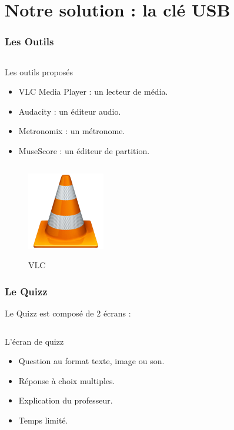 \section{Notre solution : la clé USB}
\begin{frame}
\tableofcontents[currentsection]
\end{frame}

\begin{frame}
  \frametitle{Les Outils}
  \begin{columns}[t]
    \begin{column}{10cm}
      \begin{exampleblock}{Les outils proposés}
	\begin{itemize}
	\item VLC Media Player : un lecteur de média.
	\item Audacity : un éditeur audio.
	\item Metronomix : un métronome.
        \item MuseScore : un éditeur de partition.
	\end{itemize}
      \end{exampleblock} 
    \end{column}
  \end{columns}
  \begin{figure}[!h]
    \centering
    \includegraphics[height = 0.5\textheight]{../images/tool_vlc.png}
    \label{VLC} 
    \caption{VLC}
  \end{figure}
\end{frame}

\begin{frame}
  \frametitle{Le Quizz}
  Le Quizz est composé de 2 écrans :
  \begin{columns}[t]
    \begin{column}{10cm}
      \begin{exampleblock}{L'écran de quizz}
	\begin{itemize}
        \item Question au format texte, image ou son.
        \item Réponse à choix multiples.
        \item Explication du professeur.
        \item Temps limité.
        \end{itemize}
      \end{exampleblock} 
    \end{column}
  \end{columns}  
\end{frame}

